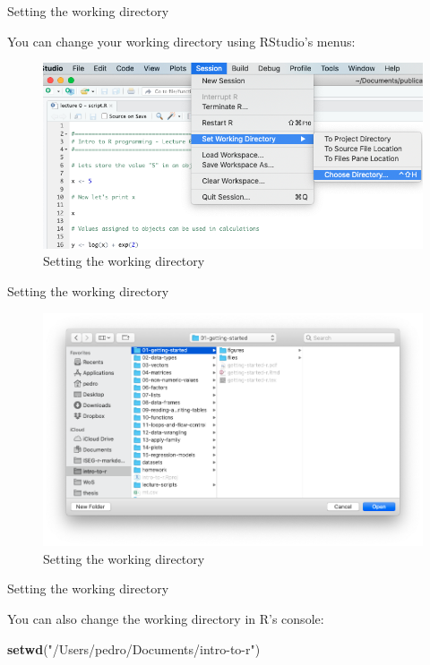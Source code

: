 \documentclass[ignorenonframetext,]{beamer}
\newenvironment{Shaded}{\begin{snugshade}}{\end{snugshade}}
\newcommand{\KeywordTok}[1]{\textcolor[rgb]{0.13,0.29,0.53}{\textbf{#1}}}
\newcommand{\NormalTok}[1]{#1}
\newcommand{\StringTok}[1]{\textcolor[rgb]{0.31,0.60,0.02}{#1}}
\begin{document}
\begin{frame}{Setting the working directory}
\protect\hypertarget{setting-the-working-directory}{}

You can change your working directory using RStudio's menus:

\begin{figure}
\includegraphics[scale = .40]{figures/wd}
\caption{Setting the working directory}
\end{figure}

\end{frame}

\begin{frame}{Setting the working directory}
\protect\hypertarget{setting-the-working-directory-1}{}

\begin{figure}
\includegraphics[scale = .35]{figures/wd2}
\caption{Setting the working directory}
\end{figure}

\end{frame}

\begin{frame}[fragile]{Setting the working directory}
\protect\hypertarget{setting-the-working-directory-2}{}

You can also change the working directory in R's console:

\begin{Shaded}
\begin{Highlighting}[]
\KeywordTok{setwd}\NormalTok{(}\StringTok{"/Users/pedro/Documents/intro-to-r"}\NormalTok{)}
\end{Highlighting}
\end{Shaded}

\end{frame}
\end{document}
